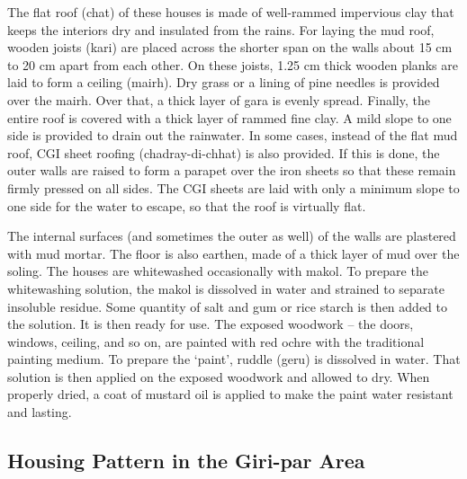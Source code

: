 The flat roof (chat) of these houses is made of well-rammed impervious clay that keeps the interiors dry and insulated from the rains. For laying the mud roof, wooden joists (kari) are placed across the shorter span on the walls about 15 cm to 20 cm apart from each other. On these joists, 1.25 cm thick wooden planks are laid to form a ceiling (mairh). Dry grass or a lining of pine needles is provided over the mairh. Over that, a thick layer of gara is evenly spread. Finally, the entire roof is covered with a thick layer of rammed fine clay. A mild slope to one side is provided to drain out the rainwater. In some cases, instead of the flat mud roof, CGI sheet roofing (chadray-di-chhat) is also provided. If this is done, the outer walls are raised to form a parapet over the iron sheets so that these remain firmly pressed on all sides. The CGI sheets are laid with only a minimum slope to one side for the water to escape, so that the roof is virtually flat.

\newpage

The internal surfaces (and sometimes the outer as well) of the walls are plastered with mud mortar. The floor is also earthen, made of a thick layer of mud over the soling. The houses are whitewashed occasionally with makol. To prepare the whitewashing solution, the makol is dissolved in water and strained to separate insoluble residue. Some quantity of salt and gum or rice starch is then added to the solution. It is then ready for use. The exposed woodwork – the doors, windows, ceiling, and so on, are painted with red ochre with the traditional painting medium. To prepare the ‘paint’, ruddle (geru) is dissolved in water. That solution is then applied on the exposed woodwork and allowed to dry. When properly dried, a coat of mustard oil is applied to make the paint water resistant and lasting.


\subsection*{Housing Pattern in the Giri-par Area}

